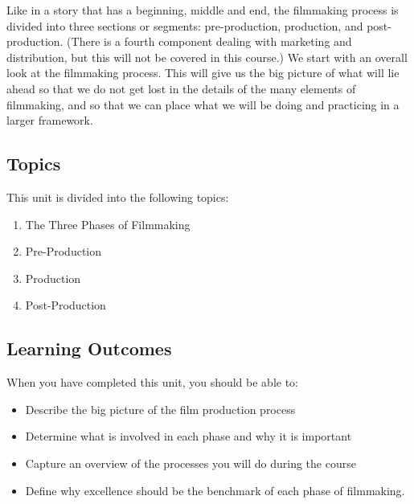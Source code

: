 \documentclass[
]{book}
\providecommand{\tightlist}{%
  \setlength{\itemsep}{0pt}\setlength{\parskip}{0pt}}
\begin{document}
Like in a story that has a beginning, middle and end, the filmmaking process is divided into three sections or segments: pre-production, production, and post-production. (There is a fourth component dealing with marketing and distribution, but this will not be covered in this course.) We start with an overall look at the filmmaking process. This will give us the big picture of what will lie ahead so that we do not get lost in the details of the many elements of filmmaking, and so that we can place what we will be doing and practicing in a larger framework.

\hypertarget{topics-1}{%
\subsection*{Topics}\label{topics-1}}

This unit is divided into the following topics:

\begin{enumerate}
\def\labelenumi{\arabic{enumi}.}
\tightlist
\item
  The Three Phases of Filmmaking\\
\item
  Pre-Production\\
\item
  Production\\
\item
  Post-Production
\end{enumerate}

\hypertarget{learning-outcomes-1}{%
\subsection*{Learning Outcomes}\label{learning-outcomes-1}}

When you have completed this unit, you should be able to:

\begin{itemize}
\item
  Describe the big picture of the film production process
\item
  Determine what is involved in each phase and why it is important
\item
  Capture an overview of the processes you will do during the course
\item
  Define why excellence should be the benchmark of each phase of filmmaking.
\end{itemize}
\end{document}
